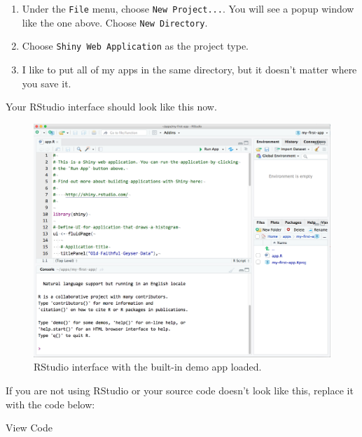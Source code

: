 \documentclass[
]{book}
\begin{document}
\begin{enumerate}
\def\labelenumi{\arabic{enumi}.}
\item
  Under the \texttt{File} menu, choose \texttt{New\ Project...}. You will see a popup window like the one above. Choose \texttt{New\ Directory}.
\item
  Choose \texttt{Shiny\ Web\ Application} as the project type.
\item
  I like to put all of my apps in the same directory, but it doesn't matter where you save it.
\end{enumerate}

Your RStudio interface should look like this now.

\begin{figure}

{\centering \includegraphics[width=1\linewidth]{images/demo_app/04-rstudio-interface} 

}

\caption{RStudio interface with the built-in demo app loaded.}\label{fig:first-rstudio-interface}
\end{figure}

If you are not using RStudio or your source code doesn't look like this, replace it with the code below:

View Code
\end{document}

